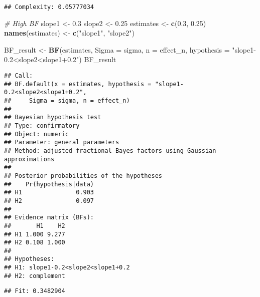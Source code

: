 \documentclass[
]{article}
\newenvironment{Shaded}{\begin{snugshade}}{\end{snugshade}}
\newcommand{\AttributeTok}[1]{\textcolor[rgb]{0.13,0.29,0.53}{#1}}
\newcommand{\CommentTok}[1]{\textcolor[rgb]{0.56,0.35,0.01}{\textit{#1}}}
\newcommand{\DecValTok}[1]{\textcolor[rgb]{0.00,0.00,0.81}{#1}}
\newcommand{\FloatTok}[1]{\textcolor[rgb]{0.00,0.00,0.81}{#1}}
\newcommand{\FunctionTok}[1]{\textcolor[rgb]{0.13,0.29,0.53}{\textbf{#1}}}
\newcommand{\NormalTok}[1]{#1}
\newcommand{\OtherTok}[1]{\textcolor[rgb]{0.56,0.35,0.01}{#1}}
\newcommand{\SpecialCharTok}[1]{\textcolor[rgb]{0.81,0.36,0.00}{\textbf{#1}}}
\newcommand{\StringTok}[1]{\textcolor[rgb]{0.31,0.60,0.02}{#1}}
\begin{document}
\begin{verbatim}
## Complexity: 0.05777034
\end{verbatim}

\begin{Shaded}
\begin{Highlighting}[]
\CommentTok{\# High BF}
\NormalTok{slope1 }\OtherTok{\textless{}{-}} \FloatTok{0.3}
\NormalTok{slope2 }\OtherTok{\textless{}{-}} \FloatTok{0.25}
\NormalTok{estimates }\OtherTok{\textless{}{-}} \FunctionTok{c}\NormalTok{(}\FloatTok{0.3}\NormalTok{, }\FloatTok{0.25}\NormalTok{)}
\FunctionTok{names}\NormalTok{(estimates) }\OtherTok{\textless{}{-}} \FunctionTok{c}\NormalTok{(}\StringTok{"slope1"}\NormalTok{, }\StringTok{"slope2"}\NormalTok{)}

\NormalTok{BF\_result }\OtherTok{\textless{}{-}} \FunctionTok{BF}\NormalTok{(estimates, }\AttributeTok{Sigma =}\NormalTok{ sigma, }\AttributeTok{n =}\NormalTok{ effect\_n, }\AttributeTok{hypothesis =} \StringTok{"slope1{-}0.2\textless{}slope2\textless{}slope1+0.2"}\NormalTok{)}
\NormalTok{BF\_result}
\end{Highlighting}
\end{Shaded}

\begin{verbatim}
## Call:
## BF.default(x = estimates, hypothesis = "slope1-0.2<slope2<slope1+0.2", 
##     Sigma = sigma, n = effect_n)
## 
## Bayesian hypothesis test
## Type: confirmatory
## Object: numeric
## Parameter: general parameters
## Method: adjusted fractional Bayes factors using Gaussian approximations
## 
## Posterior probabilities of the hypotheses
##    Pr(hypothesis|data)
## H1               0.903
## H2               0.097
## 
## Evidence matrix (BFs):
##       H1    H2
## H1 1.000 9.277
## H2 0.108 1.000
## 
## Hypotheses:
## H1: slope1-0.2<slope2<slope1+0.2
## H2: complement
\end{verbatim}

\begin{Shaded}
\end{Shaded}

\begin{verbatim}
## Fit: 0.3482904
\end{verbatim}
\end{document}
